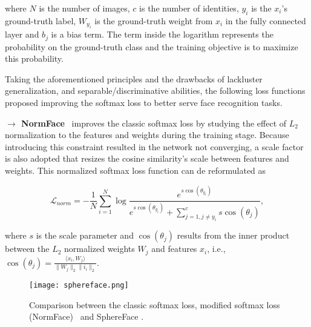 \documentclass[class=report, crop=false, a4paper, 12pt]{standalone}
\begin{document}
\noindent where $N$ is the number of images, $c$ is the number of identities, $y_i$ is the $x_i$'s ground-truth label, $W_{y_i}$ is the ground-truth weight from $x_i$ in the fully connected layer and $b_j$ is a bias term. The term inside the logarithm represents the probability on the ground-truth class and the training objective is to maximize this probability.

\vspace{\baselineskip}
\par Taking the aforementioned principles and the drawbacks of lackluster generalization, and separable/discriminative abilities, the following loss functions proposed improving the softmax loss to better serve face recognition tasks.

\vspace{0.7\baselineskip}
\noindent\textbf{$\rightarrow$ NormFace}~\autocite{wangNormFaceL2Hypersphere2017} improves the classic softmax loss by studying the effect of $L_2$ normalization to the features and weights during the training stage. Because introducing this constraint resulted in the network not converging, a scale factor is also adopted that resizes the cosine similarity's scale between features and weights. This normalized softmax loss function can de reformulated as

\begin{equation}
\mathcal{L}_{norm} = -\frac{1}{N}\sum_{i=1}^{N}\log{\frac{e^{s \cos{(\theta_{y_i})}}}{e^{s \cos{(\theta_{y_i})}}+\sum_{j=1, j\neq y_i}^{c}s \cos{(\theta_{j})}}},
\end{equation}

\noindent where $s$ is the scale parameter and $\cos{(\theta_j)}$ results from the inner product between the $L_2$ normalized  weights $W_j$ and features $x_i$, i.e., $\cos{(\theta_j)}=\frac{\langle x_i, W_j\rangle}{\|W_j\|_2\|i_i\|_2}$.

\vspace{0.7\baselineskip}
\begin{figure}[H]
    \centering
    \texttt{[image: sphereface.png]}
    \caption[Comparison between the classic softmax loss, modified softmax loss (NormFace) and SphereFace]{Comparison between the classic softmax loss, modified softmax loss (NormFace)~\autocite{wangNormFaceL2Hypersphere2017} and SphereFace \autocite{liuSphereFaceDeepHypersphere2018}.}
    \label{fig:sphereface}
\end{figure}
\end{document}
